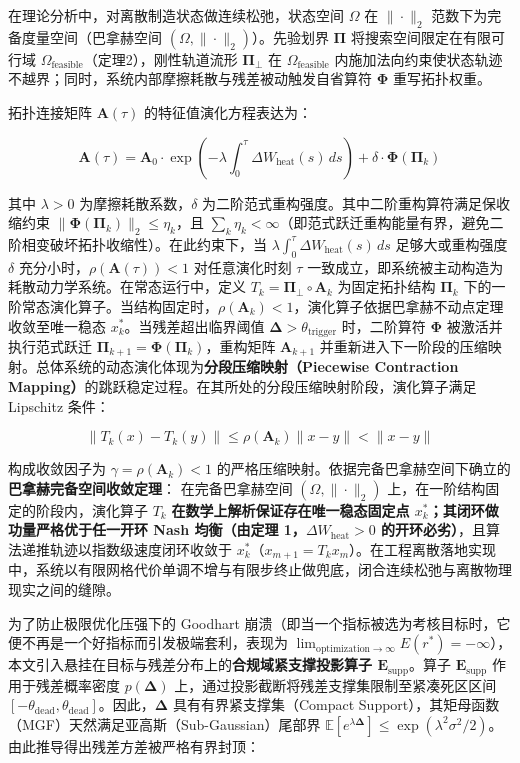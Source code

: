 \documentclass[
]{article}
\begin{document}
在理论分析中，对离散制造状态做连续松弛，状态空间 \(\Omega\) 在
\(\|\cdot\|_2\) 范数下为完备度量空间（巴拿赫空间
\((\Omega, \|\cdot\|_2)\)）。先验划界 \(\mathbf{\Pi}\)
将搜索空间限定在有限可行域
\(\Omega_{\mathrm{feasible}}\)（定理2），刚性轨道流形
\(\mathbf{\Pi}_\bot\) 在 \(\Omega_{\mathrm{feasible}}\)
内施加法向约束使状态轨迹不越界；同时，系统内部摩擦耗散与残差被动触发自省算符
\(\mathbf{\Phi}\) 重写拓扑权重。

拓扑连接矩阵 \(\mathbf{A}(\tau)\) 的特征值演化方程表达为：

\[\mathbf{A}(\tau) = \mathbf{A}_0 \cdot \exp\left(-\lambda \int_0^\tau \Delta W_{\text{heat}}(s) \, ds\right) + \delta \cdot \mathbf{\Phi}(\mathbf{\Pi}_k)\]

其中 \(\lambda > 0\) 为摩擦耗散系数，\(\delta\)
为二阶范式重构强度。其中二阶重构算符满足保收缩约束
\(\|\mathbf{\Phi}(\mathbf{\Pi}_k)\|_2 \le \eta_k\)，且
\(\sum_k \eta_k < \infty\)（即范式跃迁重构能量有界，避免二阶相变破坏拓扑收缩性）。在此约束下，当
\(\lambda \int_0^\tau \Delta W_{\text{heat}}(s) \, ds\) 足够大或重构强度
\(\delta\) 充分小时，\(\rho(\mathbf{A}(\tau)) < 1\) 对任意演化时刻
\(\tau\) 一致成立，即系统被主动构造为耗散动力学系统。在常态运行中，定义
\(T_k = \mathbf{\Pi}_\bot \circ \mathbf{A}_k\) 为固定拓扑结构
\(\mathbf{\Pi}_k\)
下的一阶常态演化算子。当结构固定时，\(\rho(\mathbf{A}_k) < 1\)，演化算子依据巴拿赫不动点定理收敛至唯一稳态
\(x_k^*\)。当残差超出临界阈值
\(\mathbf{\Delta} > \theta_{\text{trigger}}\) 时，二阶算符
\(\mathbf{\Phi}\) 被激活并执行范式跃迁
\(\mathbf{\Pi}_{k+1} = \mathbf{\Phi}(\mathbf{\Pi}_k)\)，重构矩阵
\(\mathbf{A}_{k+1}\)
并重新进入下一阶段的压缩映射。总体系统的动态演化体现为\textbf{分段压缩映射（Piecewise
Contraction
Mapping）}的跳跃稳定过程。在其所处的分段压缩映射阶段，演化算子满足
Lipschitz 条件：

\[\|T_k(x) - T_k(y)\| \le \rho(\mathbf{A}_k) \|x - y\| < \|x - y\|\]

构成收敛因子为 \(\gamma = \rho(\mathbf{A}_k) < 1\)
的严格压缩映射。依据完备巴拿赫空间下确立的\textbf{巴拿赫完备空间收敛定理}：
在完备巴拿赫空间 \((\Omega, \|\cdot\|_2)\)
上，在一阶结构固定的阶段内，演化算子 \(T_k\)
\textbf{在数学上解析保证存在唯一稳态固定点
\(x_k^\ast\)；其闭环做功量严格优于任一开环 Nash 均衡（由定理
1，\(\Delta W_{\text{heat}}>0\)
的开环必劣）}，且算法递推轨迹以指数级速度闭环收敛于
\(x_k^\ast\)（\(x_{m+1} = T_k x_m\)）。在工程离散落地实现中，系统以有限网格代价单调不增与有限步终止做兜底，闭合连续松弛与离散物理现实之间的缝隙。

为了防止极限优化压强下的 Goodhart
崩溃（即当一个指标被选为考核目标时，它便不再是一个好指标而引发极端套利，表现为
\(\lim_{\mathrm{optimization}\to\infty} E(r^\ast) = -\infty\)），本文引入悬挂在目标与残差分布上的\textbf{合规域紧支撑投影算子
\(\mathbf{E}_{\mathrm{supp}}\)}。算子 \(\mathbf{E}_{\mathrm{supp}}\)
作用于残差概率密度 \(p(\mathbf{\Delta})\)
上，通过投影截断将残差支撑集限制至紧凑死区区间
\([-\theta_{\mathrm{dead}}, \theta_{\mathrm{dead}}]\)。因此，\(\mathbf{\Delta}\)
具有有界紧支撑集（Compact
Support），其矩母函数（MGF）天然满足亚高斯（Sub-Gaussian）尾部界
\(\mathbb{E}[e^{\lambda \mathbf{\Delta}}] \le \exp(\lambda^2 \sigma^2 / 2)\)。由此推导得出残差方差被严格有界封顶：
\end{document}
